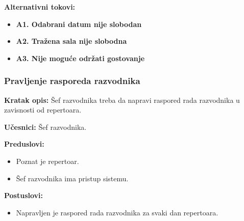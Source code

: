 \documentclass[a4paper]{article}
\begin{document}
\noindent\textbf{Alternativni tokovi:} 
\begin{itemize}
 \item \textbf{A1. Odabrani datum nije slobodan} 
  \item \textbf{A2. Tražena sala nije slobodna} 
  \item \textbf{A3. Nije moguće održati gostovanje} 
\end{itemize}


\subsubsection{Pravljenje rasporeda razvodnika} 
\noindent\textbf{Kratak opis:} Šef razvodnika treba da napravi raspored rada razvodnika u zavisnosti od repertoara.

\noindent\textbf{Učesnici:} Šef razvodnika.

\noindent\textbf{Preduslovi:}
  \begin{itemize}
    \item Poznat je repertoar.
    \item Šef razvodnika ima pristup sistemu.
  \end{itemize}

\noindent\textbf{Postuslovi:} 
  \begin{itemize}
    \item Napravljen je raspored rada razvodnika za svaki dan repertoara.
    
  \end{itemize}
\end{document}
